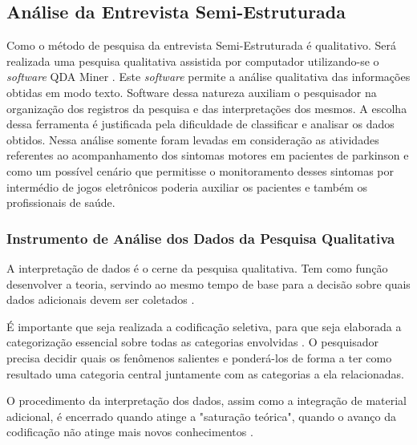 
\subsection{Análise da Entrevista Semi-Estruturada}

Como o método de pesquisa da entrevista Semi-Estruturada é qualitativo. Será realizada uma pesquisa qualitativa assistida por computador utilizando-se o \textit{software} QDA Miner \cite{qda13}. Este \textit{software} permite a análise qualitativa das informações obtidas em modo texto. Software dessa natureza auxiliam o pesquisador na organização dos registros da pesquisa e das interpretações dos mesmos. A escolha dessa ferramenta é justificada pela dificuldade de classificar e analisar os dados obtidos. Nessa análise somente foram levadas em consideração as atividades referentes ao acompanhamento dos sintomas motores em pacientes de parkinson e como um possível cenário que permitisse o monitoramento desses sintomas por intermédio de jogos eletrônicos poderia auxiliar os pacientes e também os profissionais de saúde.

\subsubsection{Instrumento de Análise dos Dados da Pesquisa Qualitativa} \label{section:analise_dados} 

A interpretação de dados é o cerne da pesquisa qualitativa. Tem como função desenvolver a teoria, servindo ao mesmo tempo de base para a decisão sobre quais dados adicionais devem ser coletados \cite{FLI04}.

É importante que seja realizada a codificação seletiva, para que seja elaborada a categorização essencial sobre todas as categorias envolvidas \cite{FLI04}. O pesquisador precisa decidir quais os fenômenos salientes e ponderá-los de forma a ter como resultado uma categoria central juntamente com as categorias a ela relacionadas.

O procedimento da interpretação dos dados, assim como a integração de material adicional, é encerrado quando atinge a "saturação teórica", quando o avanço da codificação não atinge mais novos conhecimentos \cite{FLI04}.

